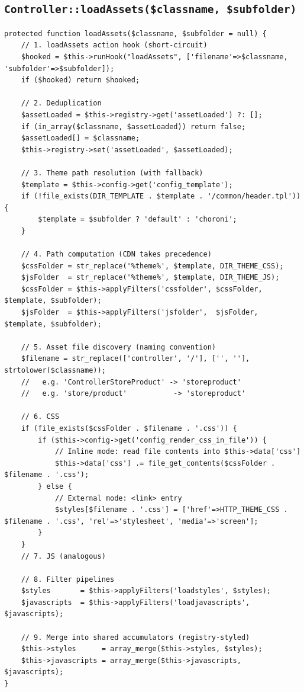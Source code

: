 \documentclass[11pt,a4paper]{article}
\begin{document}
\subsection{\texttt{Controller::loadAssets(\$classname, \$subfolder)}}

\begin{lstlisting}[caption={\texttt{Controller::loadAssets()} --- the route-aware asset loader (abridged).},label={lst:loadassets}]
protected function loadAssets($classname, $subfolder = null) {
    // 1. loadAssets action hook (short-circuit)
    $hooked = $this->runHook("loadAssets", ['filename'=>$classname, 'subfolder'=>$subfolder]);
    if ($hooked) return $hooked;

    // 2. Deduplication
    $assetLoaded = $this->registry->get('assetLoaded') ?: [];
    if (in_array($classname, $assetLoaded)) return false;
    $assetLoaded[] = $classname;
    $this->registry->set('assetLoaded', $assetLoaded);

    // 3. Theme path resolution (with fallback)
    $template = $this->config->get('config_template');
    if (!file_exists(DIR_TEMPLATE . $template . '/common/header.tpl')) {
        $template = $subfolder ? 'default' : 'choroni';
    }

    // 4. Path computation (CDN takes precedence)
    $cssFolder = str_replace('%theme%', $template, DIR_THEME_CSS);
    $jsFolder  = str_replace('%theme%', $template, DIR_THEME_JS);
    $cssFolder = $this->applyFilters('cssfolder', $cssFolder, $template, $subfolder);
    $jsFolder  = $this->applyFilters('jsfolder',  $jsFolder,  $template, $subfolder);

    // 5. Asset file discovery (naming convention)
    $filename = str_replace(['controller', '/'], ['', ''], strtolower($classname));
    //   e.g. 'ControllerStoreProduct' -> 'storeproduct'
    //   e.g. 'store/product'           -> 'storeproduct'

    // 6. CSS
    if (file_exists($cssFolder . $filename . '.css')) {
        if ($this->config->get('config_render_css_in_file')) {
            // Inline mode: read file contents into $this->data['css']
            $this->data['css'] .= file_get_contents($cssFolder . $filename . '.css');
        } else {
            // External mode: <link> entry
            $styles[$filename . '.css'] = ['href'=>HTTP_THEME_CSS . $filename . '.css', 'rel'=>'stylesheet', 'media'=>'screen'];
        }
    }
    // 7. JS (analogous)

    // 8. Filter pipelines
    $styles       = $this->applyFilters('loadstyles', $styles);
    $javascripts  = $this->applyFilters('loadjavascripts', $javascripts);

    // 9. Merge into shared accumulators (registry-styled)
    $this->styles      = array_merge($this->styles, $styles);
    $this->javascripts = array_merge($this->javascripts, $javascripts);
}
\end{lstlisting}
\end{document}

